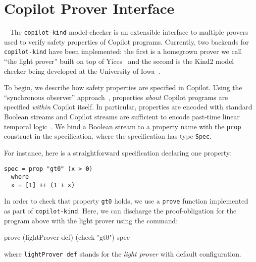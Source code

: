 \section{Copilot Prover Interface}~\label{sec:prover} 
The \texttt{copilot-kind} model-checker is an extensible interface to multiple
provers used to verify safety properties of Copilot
programs. Currently, two backends for \texttt{copilot-kind} have been implemented: the first is a
homegrown prover we call ``the light prover'' built on top of
Yices~\cite{Dutertre:cav2014} and the second is the Kind2 model checker being developed at
the University of Iowa~\cite{kind}.

To begin, we describe how safety properties are specified in Copilot. Using the
``synchronous observer'' approach~\cite{amast93}, properties \emph{about}
Copilot programs are specified \emph{within} Copilot itself. In particular,
properties are encoded with standard Boolean streams and Copilot streams are
sufficient to encode past-time linear temporal logic~\cite{ptltl}. We bind a Boolean stream
to a property name with the \texttt{prop} construct in the specification, where
the specification has type \texttt{Spec}. 

For instance, here is a straightforward specification declaring one
property:

\begin{lstlisting}[frame=single]
spec = prop "gt0" (x > 0)
  where 
  x = [1] ++ (1 + x)
\end{lstlisting}

In order  to check that property \texttt{gt0} holds, we use a \texttt{prove}
function implemented as part of \texttt{copilot-kind}.
Here, we can discharge the proof-obligation for the program above with the light prover using the command:
\begin{code}
prove (lightProver def) (check "gt0") spec
\end{code}
where \texttt{lightProver def} stands for the \emph{light prover} with
default configuration.


%
%
%  
%
%

